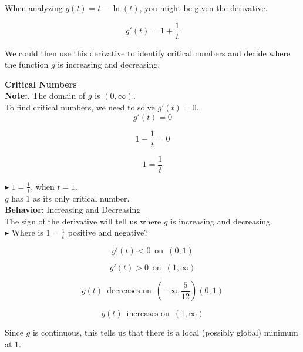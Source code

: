 \documentclass{ximera}
\begin{document}
\begin{example}

When analyzing $g(t) = t - \ln(t)$, you might be given the derivative.


\[
g'(t) = 1 + \frac{1}{t} 
\]


We could then use this derivative to identify critical numbers and decide where the function $g$ is increasing and decreasing.




\textbf{Critical Numbers} \\


\textbf{Note:}. The domain of $g$ is $(0, \infty)$. \\



To find critical numbers, we need to solve $g'(t) = 0$. \\


\[
g'(t) = 0
\]


\[
1 - \frac{1}{t}  = 0
\]


\[
1  = \frac{1}{t}
\]





$\blacktriangleright$ $1  = \frac{1}{t}$, when $t = 1$. \\



$g$ has $1$ as its only critical number. \\




\textbf{Behavior}: Increasing and Decreasing \\



The sign of the derivative will tell us where $g$ is increasing and decreasing. \\


\textbf{\textcolor{blue!55!black}{$\blacktriangleright$}} Where is $1  = \frac{1}{t}$ positive and negative?





\[
g'(t) < 0 \, \text{ on } \, (0, 1)
\]


\[
g'(t) > 0 \, \text{ on } \, (1, \infty)
\]





\[
g(t)  \, \text{ decreases on } \, \left( -\infty, \frac{5}{12} \right)(0, 1)
\]


\[
g(t)  \, \text{ increases on } \, (1, \infty)
\]



Since $g$ is continuous, this tells us that there is a local (possibly global) minimum at $1$.


\end{example}
\end{document}
